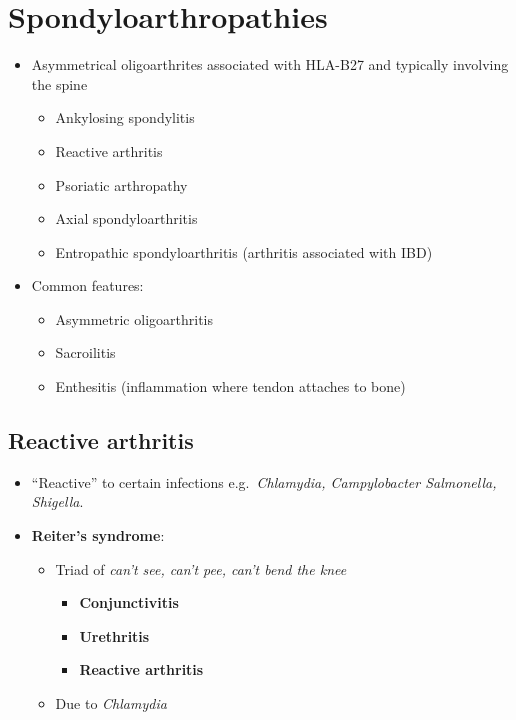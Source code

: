 \documentclass[
  12pt,
]{memoir}
\providecommand{\tightlist}{%
  \setlength{\itemsep}{0pt}\setlength{\parskip}{0pt}}
\begin{document}
\hypertarget{spondyloarthropathies}{%
\section{Spondyloarthropathies}\label{spondyloarthropathies}}

\begin{itemize}
\tightlist
\item
  Asymmetrical oligoarthrites associated with HLA-B27 and typically
  involving the spine

  \begin{itemize}
  \tightlist
  \item
    Ankylosing spondylitis
  \item
    Reactive arthritis
  \item
    Psoriatic arthropathy
  \item
    Axial spondyloarthritis
  \item
    Entropathic spondyloarthritis (arthritis associated with IBD)
  \end{itemize}
\item
  Common features:

  \begin{itemize}
  \tightlist
  \item
    Asymmetric oligoarthritis
  \item
    Sacroilitis
  \item
    Enthesitis (inflammation where tendon attaches to bone)
  \end{itemize}
\end{itemize}

\hypertarget{reactive-arthritis}{%
\subsection{Reactive arthritis}\label{reactive-arthritis}}

\begin{itemize}
\tightlist
\item
  ``Reactive'' to certain infections e.g.~\emph{Chlamydia, Campylobacter
  Salmonella, Shigella}.
\item
  \textbf{Reiter's syndrome}:

  \begin{itemize}
  \tightlist
  \item
    Triad of \emph{can't see, can't pee, can't bend the knee}

    \begin{itemize}
    \tightlist
    \item
      \textbf{Conjunctivitis}
    \item
      \textbf{Urethritis}
    \item
      \textbf{Reactive arthritis}
    \end{itemize}
  \item
    Due to \emph{Chlamydia}
  \end{itemize}
\end{itemize}
\end{document}
